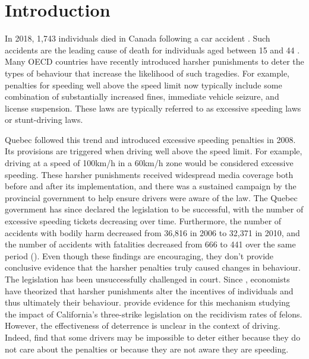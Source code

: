\section{Introduction}
\label{sec:Introduction}

In 2018, 1,743 individuals died in Canada following a car accident 
\citep{transcan2018}. 
Such accidents are the leading cause of death for individuals aged between 15 and 44
\citep{statscan2020}. 
Many OECD countries have recently introduced harsher punishments to deter the types of behaviour that increase the likelihood of such tragedies. For example, penalties for speeding well above the speed limit now typically include some combination of substantially increased fines, immediate vehicle seizure, and license suspension. These laws are typically referred to as excessive speeding laws or stunt-driving laws.

Quebec followed this trend and introduced excessive speeding penalties in 2008. Its provisions are triggered when driving well above the speed limit. For example, driving at a speed of 100km/h in a 60km/h zone would be considered excessive speeding. These harsher punishments received widespread media coverage both before and after its implementation, and there was a sustained campaign by the provincial government to help ensure drivers were aware of the law. The Quebec government has since declared the legislation to be successful, with the number of excessive speeding tickets decreasing over time. Furthermore, the number of accidents with bodily harm decreased from 36,816 in 2006 to 32,371 in 2010, and the number of accidents with fatalities decreased from 666 to 441 over the same period 
(\citet{saaq2011}). 
Even though these findings are encouraging, they don’t provide conclusive evidence that the harsher penalties truly caused changes in behaviour. The legislation has been unsuccessfully challenged in court.
Since 
\citet{becker1968b}, 
economists have theorized that harsher punishments alter the incentives of individuals and thus ultimately their behaviour. 
\citet{hellandtabarrok2007} 
provide evidence for this mechanism studying the impact of California’s three-strike legislation on the recidivism rates of felons. However, the effectiveness of deterrence is unclear in the context of driving. Indeed, 
\citet{bourgeonpicard2007} 
find that some drivers may be impossible to deter either because they do not care about the penalties or because they are not aware they are speeding.


